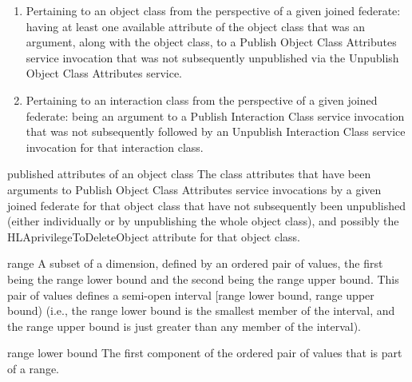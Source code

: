 \begin{enumerate}[label=\alph*)]
\item Pertaining to an object class from the perspective of a given joined federate: having at least one available attribute of the object class that was an argument, along with the object class, to a Publish Object Class Attributes service invocation that was not subsequently unpublished via the Unpublish Object Class Attributes service.
\par{}
\item Pertaining to an interaction class from the perspective of a given joined federate: being an argument to a Publish Interaction Class service invocation that was not subsequently followed by an Unpublish Interaction Class service invocation for that interaction class.
\par{}
\end{enumerate}

\newpage
\begin{definition}{published attributes of an object class}
    The class attributes that have been arguments to Publish Object Class Attributes service invocations by a given joined federate for that object class that have not subsequently been unpublished (either individually or by unpublishing the whole object class), and possibly the HLAprivilegeToDeleteObject attribute for that object class.
\end{definition}


\begin{definition}{range}
    A subset of a dimension, defined by an ordered pair of values, the first being the range lower bound and the second being the range upper bound. This pair of values defines a semi-open interval [range lower bound, range upper bound) (i.e., the range lower bound is the smallest member of the interval, and the range upper bound is just greater than any member of the interval).
\end{definition}


\begin{definition}{range lower bound}
    The first component of the ordered pair of values that is part of a range.
\end{definition}

